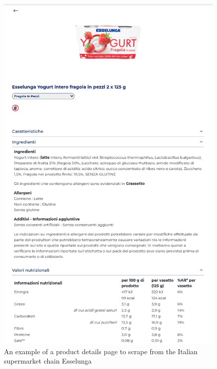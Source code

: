 \begin{center}
\begin{figure}[H]
    \includegraphics[scale=0.39]{images/product_example.png}
    \caption{An example of a product details page to scrape from the Italian supermarket chain Esselunga} 
    \label{fig:scraped_data}
\end{figure}
\end{center}


